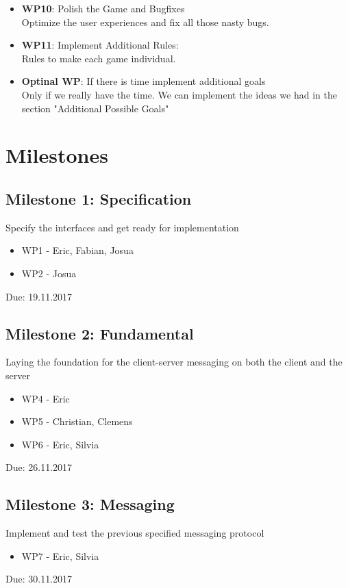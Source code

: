 \documentclass{sig-alternate}
\begin{document}
\begin{itemize}
	\item {\bf WP10}: Polish the Game and Bugfixes\\
	Optimize the user experiences and fix all those nasty bugs.
		
	\item {\bf WP11}: Implement Additional Rules:\\
	Rules to make each game individual.
		
	\item {\bf Optinal WP}: If there is time implement additional goals\\
        Only if we really have the time. We can implement the ideas we had in the section "Additional Possible Goals"
        
\end{itemize}

\section{Milestones}

\subsection{Milestone 1: Specification}
Specify the interfaces and get ready for implementation
\begin{itemize}
	\item WP1 - Eric, Fabian, Josua
	\item WP2 - Josua
\end{itemize}
Due: 19.11.2017

\subsection{Milestone 2: Fundamental}
Laying the foundation for the client-server messaging on both the client and the server
\begin{itemize}
	\item WP4 - Eric
	\item WP5 - Christian, Clemens
	\item WP6 - Eric, Silvia
\end{itemize}
Due: 26.11.2017
	
\subsection{Milestone 3: Messaging}
Implement and test the previous specified messaging protocol
\begin{itemize}
	\item WP7 - Eric, Silvia
\end{itemize}
Due: 30.11.2017
\end{document}
